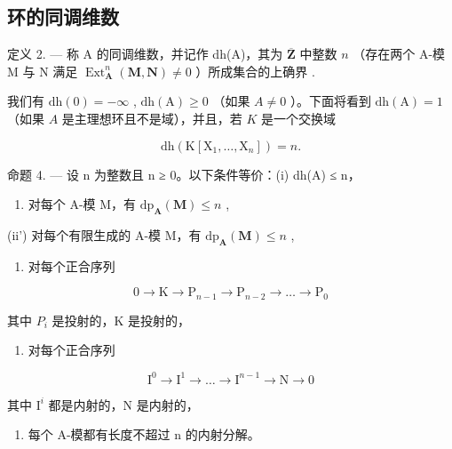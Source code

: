 \subsection{环的同调维数}

定义 2. --- 称 A 的同调维数，并记作 dh(A)，其为 \(\overline{\mathbf{Z}}\) 中整数 \(n\) （存在两个 A-模 M 与 N 满足 \(\operatorname{Ext}_{\mathbf{A}}^{n}(\mathbf{M},\mathbf{N})\neq0\) ）所成集合的上确界 .

我们有 \(\mathrm{dh}(0) = -\infty\) , \(\mathrm{dh(A)} \geqslant 0\) （如果 \(A \neq 0\) ）。下面将看到 \(\mathrm{dh(A)} = 1\) （如果 \(A\) 是主理想环且不是域），并且，若 \(K\) 是一个交换域

\[
\mathrm{dh} (\mathrm{K} [ \mathrm{X} _ {1}, \dots , \mathrm{X} _ {n} ]) = n.
\]

命题 4. --- 设 n 为整数且 n ≥ 0。以下条件等价：(i) dh(A) ≤ n，

\begin{enumerate}
\def\labelenumi{(\roman{enumi})}
\setcounter{enumi}{1}
\tightlist
\item
  对每个 A-模 M，有 \(\mathrm{dp}_{\mathbf{A}}(\mathbf{M}) \leqslant n\) ,
\end{enumerate}

(ii') 对每个有限生成的 A-模 M，有 \(\mathrm{dp}_{\mathbf{A}}(\mathbf{M}) \leqslant n\) ,

\begin{enumerate}
\def\labelenumi{(\roman{enumi})}
\setcounter{enumi}{2}
\tightlist
\item
  对每个正合序列
\end{enumerate}

\[
0 \rightarrow \mathrm{K} \rightarrow \mathrm{P} _ {n - 1} \rightarrow \mathrm{P} _ {n - 2} \rightarrow \dots \rightarrow \mathrm{P} _ {0}
\]

其中 \(P_{i}\) 是投射的，K 是投射的，

\begin{enumerate}
\def\labelenumi{(\roman{enumi})}
\setcounter{enumi}{3}
\tightlist
\item
  对每个正合序列
\end{enumerate}

\[
\mathrm{I} ^ {0} \rightarrow \mathrm{I} ^ {1} \rightarrow \dots \rightarrow \mathrm{I} ^ {n - 1} \rightarrow \mathrm{N} \rightarrow 0
\]

其中 \(\mathrm{I}^{i}\) 都是内射的，N 是内射的，

\begin{enumerate}
\def\labelenumi{(\alph{enumi})}
\setcounter{enumi}{21}
\tightlist
\item
  每个 A-模都有长度不超过 n 的内射分解。
\end{enumerate}

